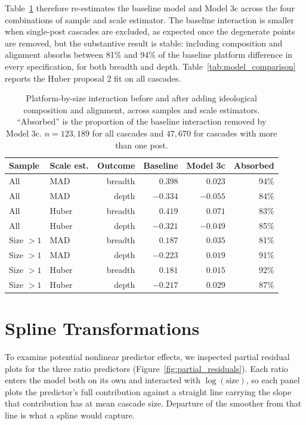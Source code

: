 \documentclass[letterpaper]{article} %
\newcommand{\rev}[1]{{\color{blue}#1}}
\begin{document}
\rev{Table~\ref{tab:specrob} therefore re-estimates the baseline model and Model 3c across the four combinations of sample and scale estimator. The baseline interaction is smaller when single-post cascades are excluded, as expected once the degenerate points are removed, but the substantive result is stable: including composition and alignment absorbs between 81\% and 94\% of the baseline platform difference in every specification, for both breadth and depth. Table~\ref{tab:model_comparison} reports the Huber proposal 2 fit on all cascades.}

\begin{table}[!t]
\centering
\footnotesize
\setlength{\tabcolsep}{3pt}
\rev{
\begin{tabular}{llrrrr}
\toprule
Sample & Scale est. & Outcome & Baseline & Model 3c & Absorbed \\
\midrule
All & MAD & breadth & $0.398$ & $0.023$ & 94\% \\
All & MAD & depth & $-0.334$ & $-0.055$ & 84\% \\
All & Huber & breadth & $0.419$ & $0.071$ & 83\% \\
All & Huber & depth & $-0.321$ & $-0.049$ & 85\% \\
Size $>1$ & MAD & breadth & $0.187$ & $0.035$ & 81\% \\
Size $>1$ & MAD & depth & $-0.223$ & $0.019$ & 91\% \\
Size $>1$ & Huber & breadth & $0.181$ & $0.015$ & 92\% \\
Size $>1$ & Huber & depth & $-0.217$ & $0.029$ & 87\% \\
\bottomrule
\end{tabular}
}
\caption{\rev{Platform-by-size interaction before and after adding ideological composition and alignment, across samples and scale estimators. ``Absorbed'' is the proportion of the baseline interaction removed by Model 3c. $n = 123{,}189$ for all cascades and $47{,}670$ for cascades with more than one post.}}
\label{tab:specrob}
\end{table}

\section{Spline Transformations}
\label{app:spline}
\rev{To examine potential nonlinear predictor effects, we inspected partial residual plots for the three ratio predictors (Figure~\ref{fig:partial_residuals}). Each ratio enters the model both on its own and interacted with $\log(\text{size})$, so each panel plots the predictor's full contribution against a straight line carrying the slope that contribution has at mean cascade size. Departure of the smoother from that line is what a spline would capture.}
\end{document}
